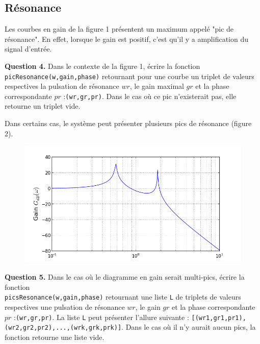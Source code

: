 \documentclass[11pt,fleqn]{book} %
\begin{document}
\subsection{Résonance}

Les courbes en gain de la figure 1 présentent un maximum appelé "pic de résonance". En effet, lorsque le gain est positif, c'est qu'il y a amplification du signal d'entrée.

\begin{tBox}
\textbf{Question 4.} Dans le contexte de la figure 1, écrire la fonction \texttt{picResonance(w,gain,phase)} retournant pour une courbe un triplet de valeurs respectives la pulsation de résonance $wr$, le gain maximal $gr$ et la phase correspondante $pr$ :\texttt{(wr,gr,pr)}. Dans le cas où ce pic n'existerait pas, elle retourne un triplet vide.
\end{tBox}

Dans certains cas, le système peut présenter plusieurs pics de résonance (figure 2).

\begin{figure}[!h]
\begin{center}
\includegraphics[scale=0.5]{figure_2.png} 
\end{center}
\end{figure}

\begin{tBox}
\textbf{Question 5.} Dans le cas où le diagramme en gain serait multi-pics, écrire la fonction \\ \texttt{picsResonance(w,gain,phase)} retournant une liste \texttt{L} de triplets de valeurs respectives une pulsation de résonance $wr$, le gain $gr$ et la phase correspondante $pr$ :\texttt{(wr,gr,pr)}. La liste \texttt{L} peut présenter l'allure suivante : \texttt{[(wr1,gr1,pr1),(wr2,gr2,pr2),...,(wrk,grk,prk)]}. Dans le cas où il n'y aurait aucun pics, la fonction retourne une liste vide.
\end{tBox}
\end{document}
